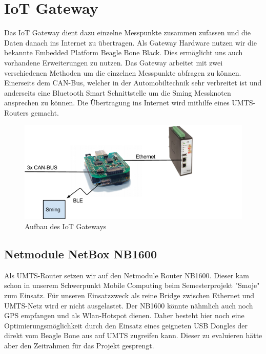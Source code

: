 \chapter{IoT Gateway}\label{chap:iotgateway}

Das IoT Gateway dient dazu einzelne Messpunkte zusammen zufassen und die Daten danach ins Internet zu übertragen. Als Gateway Hardware nutzen wir die bekannte Embedded Platform Beagle Bone Black. Dies ermöglicht uns auch vorhandene Erweiterungen zu nutzen. Das Gateway arbeitet mit zwei verschiedenen Methoden um die einzelnen Messpunkte abfragen zu können. Einerseits dem CAN-Bus, welcher in der Automobiltechnik sehr verbreitet ist und anderseits eine Bluetooth Smart Schnittstelle um die Sming Messknoten ansprechen zu können. Die Übertragung ins Internet wird mithilfe eines UMTS-Routers gemacht.



\begin{figure}[hbtp]
    \center
    \includegraphics[width=\textwidth]{bilder/aufbau_in_auto.png}
    \caption{Aufbau des IoT Gateways}
    \label{fig:aufbau_iot_gateway}
\end{figure}

\section{Netmodule NetBox NB1600}\label{sec:netbox}
Als UMTS-Router setzen wir auf den Netmodule Router NB1600. Dieser kam schon in unserem Schwerpunkt Mobile Computing beim Semesterprojekt "Smoje" zum Einsatz. Für unseren Einsatzzweck als reine Bridge zwischen Ethernet und UMTS-Netz wird er nicht ausgelastet. Der NB1600 könnte nähmlich auch noch GPS empfangen und als Wlan-Hotspot dienen. Daher besteht hier noch eine Optimierungsmöglichkeit durch den Einsatz eines geigneten USB Dongles der direkt vom Beagle Bone aus auf UMTS zugreifen kann. Dieser zu evaluieren hätte aber den Zeitrahmen für das Projekt gesprengt.

